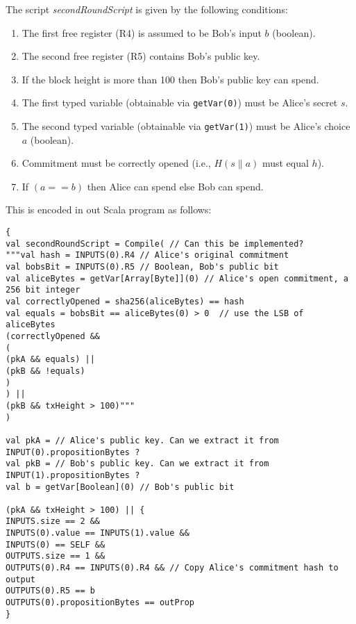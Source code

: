 \documentclass[11pt]{article}
\begin{document}
		
The script {\em secondRoundScript} is given by the following conditions:
\begin{enumerate}
	\item The first free register (R4) is assumed to be Bob's input $b$ (boolean).
	\item The second free register (R5) contains Bob's public key. 
	\item If the block height is more than 100 then Bob's public key can spend.
	\item The first typed variable (obtainable via \texttt{getVar(0)}) must be Alice's secret $s$.
	\item The second typed variable (obtainable via \texttt{getVar(1)}) must be Alice's choice $a$ (boolean).
	\item Commitment must be correctly opened (i.e., $H(s\|a)$ must equal $h$).
	\item If $(a == b)$ then Alice can spend else Bob can spend.	
\end{enumerate}

% 
This is encoded in out Scala program as follows: 

\begin{verbatim}
{
val secondRoundScript = Compile( // Can this be implemented?
"""val hash = INPUTS(0).R4 // Alice's original commitment
val bobsBit = INPUTS(0).R5 // Boolean, Bob's public bit
val aliceBytes = getVar[Array[Byte]](0) // Alice's open commitment, a 256 bit integer
val correctlyOpened = sha256(aliceBytes) == hash 
val equals = bobsBit == aliceBytes(0) > 0  // use the LSB of aliceBytes
(correctlyOpened && 
(
(pkA && equals) || 
(pkB && !equals)
)
) || 
(pkB && txHeight > 100)"""
)

val pkA = // Alice's public key. Can we extract it from INPUT(0).propositionBytes ? 
val pkB = // Bob's public key. Can we extract it from INPUT(1).propositionBytes ?
val b = getVar[Boolean](0) // Bob's public bit

(pkA && txHeight > 100) || {
INPUTS.size == 2 && 
INPUTS(0).value == INPUTS(1).value && 
INPUTS(0) == SELF &&
OUTPUTS.size == 1 &&
OUTPUTS(0).R4 == INPUTS(0).R4 && // Copy Alice's commitment hash to output
OUTPUTS(0).R5 == b 
OUTPUTS(0).propositionBytes == outProp
}
\end{verbatim}
\end{document}
